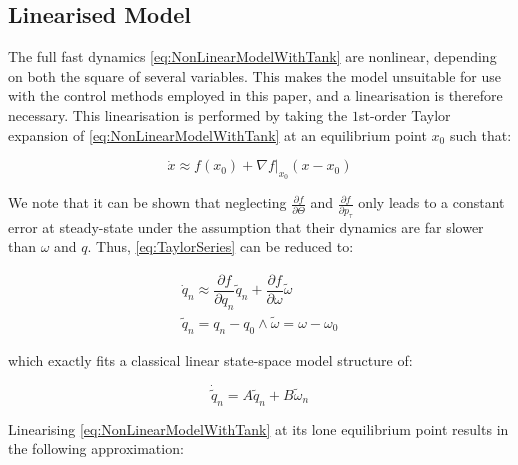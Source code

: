 \subsection{Linearised Model}

The full fast dynamics \cref{eq:NonLinearModelWithTank} are nonlinear, depending on both the square of several variables. This makes the model unsuitable for use with the control methods employed in this paper, and a linearisation is therefore necessary. This linearisation is performed by taking the $1$st-order Taylor expansion of \cref{eq:NonLinearModelWithTank} at an equilibrium point $x_0$ such that:

\begin{equation}\label{eq:TaylorSeries}
	\dot{x} \approx f(x_0) + \nabla f\bigg\rvert_{x_0} (x-x_0)
\end{equation}

We note that it can be shown that neglecting $\frac{\partial f}{\partial \Theta}$ and $\frac{\partial f}{\partial p_\tau}$ only leads to a constant error at steady-state under the assumption that their dynamics are far slower than $\omega$ and $q$. Thus, \cref{eq:TaylorSeries} can be reduced to:

\begin{equation}\label{eq:TaylorSeriesSimple}
\begin{gathered}
	\dot{q}_n \approx \dfrac{\partial f}{\partial q_n} \tilde{q}_n + \dfrac{\partial f}{\partial \omega} \tilde{\omega} \\
	\tilde{q}_n = q_n-q_0 \wedge \tilde{\omega} = \omega-\omega_0
\end{gathered}
\end{equation}

which exactly fits a classical linear state-space model structure of:

\begin{equation}\label{eq:}
	\dot{\tilde{q}}_n = A\tilde{q}_n + B \tilde{\omega}_n
\end{equation}

Linearising \cref{eq:NonLinearModelWithTank} at its lone equilibrium point results in the following approximation:


